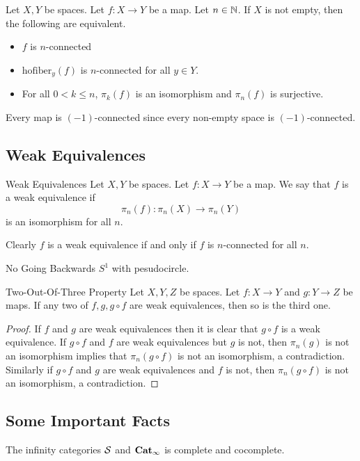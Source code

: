 \documentclass[a4paper]{article}
\begin{document}
\begin{prp}{}{} Let $X,Y$ be spaces. Let $f:X\to Y$ be a map. Let $n\in\mathbb{N}$. If $X$ is not empty, then the following are equivalent. 
\begin{itemize}
\item $f$ is $n$-connected
\item $\text{hofiber}_y(f)$ is $n$-connected for all $y\in Y$. 
\item For all $0<k\leq n$, $\pi_k(f)$ is an isomorphism and $\pi_n(f)$ is surjective. 
\end{itemize}
\end{prp}

Every map is $(-1)$-connected since every non-empty space is $(-1)$-connected. 

\subsection{Weak Equivalences}
\begin{defn}{Weak Equivalences}{} Let $X,Y$ be spaces. Let $f:X\to Y$ be a map. We say that $f$ is a weak equivalence if $$\pi_n(f):\pi_n(X)\to\pi_n(Y)$$ is an isomorphism for all $n$. 
\end{defn}

Clearly $f$ is a weak equivalence if and only if $f$ is $n$-connected for all $n$. 

\begin{eg}{No Going Backwards}{} $S^1$ with pesudocircle. 
\end{eg}

\begin{prp}{Two-Out-Of-Three Property}{} Let $X,Y,Z$ be spaces. Let $f:X\to Y$ and $g:Y\to Z$ be maps. If any two of $f,g,g\circ f$ are weak equivalences, then so is the third one. \tcbline
\begin{proof}
If $f$ and $g$ are weak equivalences then it is clear that $g\circ f$ is a weak equivalence. If $g\circ f$ and $f$ are weak equivalences but $g$ is not, then $\pi_n(g)$ is not an isomorphism implies that $\pi_n(g\circ f)$ is not an isomorphism, a contradiction. Similarly if $g\circ f$ and $g$ are weak equivalences and $f$ is not, then $\pi_n(g\circ f)$ is not an isomorphism, a contradiction. 
\end{proof}
\end{prp}

\subsection{Some Important Facts}
\begin{prp}{}{} The infinity categories $\mathcal{S}$ and $\bold{Cat}_\infty$ is complete and cocomplete. 
\end{prp}
\end{document}
